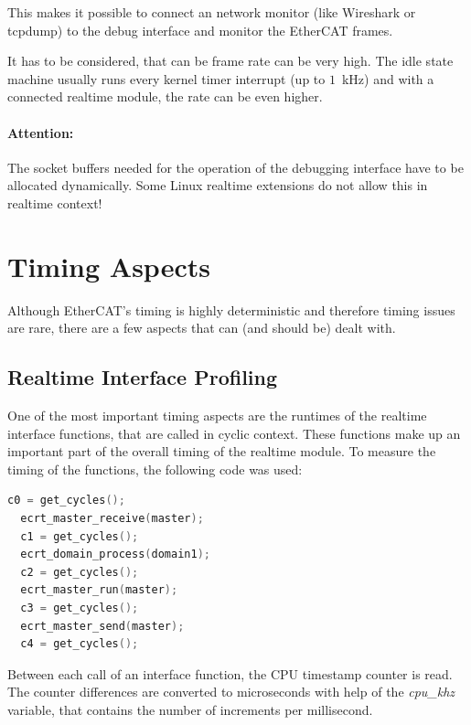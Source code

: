 \documentclass[a4paper,12pt,BCOR6mm,bibtotoc,idxtotoc]{scrbook}
\begin{document}
This makes it possible to connect an network monitor (like Wireshark
or tcpdump) to the debug interface and monitor the EtherCAT frames.

It has to be considered, that can be frame rate can be very high. The
idle state machine usually runs every kernel timer interrupt (up to
$1$~kHz) and with a connected realtime module, the rate can be even
higher.

\paragraph{Attention:} The socket buffers needed for the operation of
the debugging interface have to be allocated dynamically. Some Linux
realtime extensions do not allow this in realtime context!


\section{Timing Aspects}
\label{sec:timing}

Although EtherCAT's timing is highly deterministic and therefore
timing issues are rare, there are a few aspects that can (and should
be) dealt with.


\subsection{Realtime Interface Profiling}
\label{sec:timing-profile}

One of the most important timing aspects are the runtimes of the
realtime interface functions, that are called in cyclic context. These
functions make up an important part of the overall timing of the
realtime module. To measure the timing of the functions, the following
code was used:

\begin{lstlisting}[gobble=2,language=C]
  c0 = get_cycles();
  ecrt_master_receive(master);
  c1 = get_cycles();
  ecrt_domain_process(domain1);
  c2 = get_cycles();
  ecrt_master_run(master);
  c3 = get_cycles();
  ecrt_master_send(master);
  c4 = get_cycles();
\end{lstlisting}

Between each call of an interface function, the CPU timestamp counter
is read. The counter differences are converted to microseconds with
help of the \textit{cpu\_khz} variable, that contains the number of
increments per millisecond.
\end{document}
